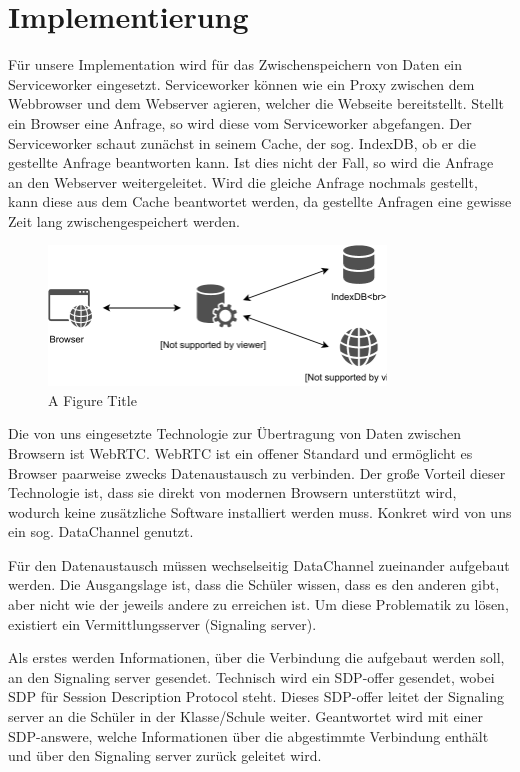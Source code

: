 \chapter{Implementierung}\label{ch:implementation}

Für unsere Implementation wird für das Zwischenspeichern von Daten ein Serviceworker eingesetzt. Serviceworker können wie ein Proxy zwischen dem Webbrowser und dem Webserver agieren, welcher die Webseite bereitstellt. Stellt ein Browser eine Anfrage, so wird diese vom Serviceworker abgefangen. Der Serviceworker schaut zunächst in seinem Cache, der sog. IndexDB, ob er die gestellte Anfrage beantworten kann. Ist dies nicht der Fall, so wird die Anfrage an den Webserver weitergeleitet. Wird die gleiche Anfrage nochmals gestellt, kann diese aus dem Cache beantwortet werden, da gestellte Anfragen eine gewisse Zeit lang zwischengespeichert werden.
\begin{figure}[!h]
	\centering
	\includegraphics[width=0.8\textwidth]{figures/ServiceWorker}
	\caption[A Figure Short-Title]{A Figure Title}
	\label{fig:sequenceDiagram}
\end{figure}


Die von uns eingesetzte Technologie zur Übertragung von Daten zwischen Browsern ist WebRTC. WebRTC ist ein offener Standard und ermöglicht es Browser paarweise zwecks Datenaustausch zu verbinden. Der große Vorteil dieser Technologie ist, dass sie direkt von modernen Browsern unterstützt wird, wodurch keine zusätzliche Software installiert werden muss. Konkret wird von uns ein sog. DataChannel genutzt.

Für den Datenaustausch müssen wechselseitig DataChannel zueinander aufgebaut werden. Die Ausgangslage ist, dass die Schüler wissen, dass es den anderen gibt, aber nicht wie der jeweils andere zu erreichen ist. Um diese Problematik zu lösen, existiert ein Vermittlungsserver (Signaling server).

Als erstes werden Informationen, über die Verbindung die aufgebaut werden soll, an den Signaling server gesendet. Technisch wird ein SDP-offer gesendet, wobei SDP für Session Description Protocol steht. Dieses SDP-offer leitet der Signaling server an die Schüler in der Klasse/Schule weiter. Geantwortet wird mit einer SDP-answere, welche Informationen über die abgestimmte Verbindung enthält und über den Signaling server zurück geleitet wird.

